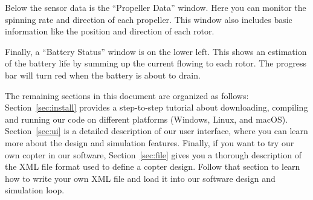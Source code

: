 Below the sensor data is the ``Propeller Data'' window. Here you can monitor the spinning rate and direction of each propeller. This window also includes basic information like the position and direction of each rotor.

Finally, a ``Battery Status'' window is on the lower left. This shows an estimation of the battery life by summing up the current flowing to each rotor. The progress bar will turn red when the battery is about to drain.

The remaining sections in this document are organized as follows: Section~\ref{sec:install} provides a step-to-step tutorial about downloading, compiling and running our code on different platforms (Windows, Linux, and macOS). Section~\ref{sec:ui} is a detailed description of our user interface, where you can learn more about the design and simulation features. Finally, if you want to try our own copter in our software, Section~\ref{sec:file} gives you a thorough description of the XML file format used to define a copter design. Follow that section to learn how to write your own XML file and load it into our software design and simulation loop.